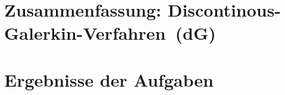 \documentclass[12pt,a4paper]{scrartcl}
\numberwithin{equation}{section}
\begin{document}


\tableofcontents

\section{Zusammenfassung: Discontinous-Galerkin-Verfahren~(dG) }

\newpage
\section{Ergebnisse der Aufgaben}
\end{document}
